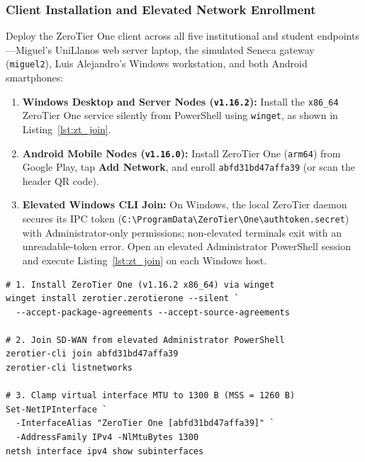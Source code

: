 \subsubsection{Client Installation and Elevated Network Enrollment}
Deploy the ZeroTier One client across all five institutional and student endpoints---Miguel's UniLlanos web server laptop, the simulated Seneca gateway (\texttt{miguel2}), Luis Alejandro's Windows workstation, and both Android smartphones:
\begin{enumerate}
    \item \textbf{Windows Desktop and Server Nodes (\texttt{v1.16.2}):} Install the \texttt{x86\_64} ZeroTier One service silently from PowerShell using \texttt{winget}, as shown in Listing~\ref{lst:zt_join}.
    \item \textbf{Android Mobile Nodes (\texttt{v1.16.0}):} Install ZeroTier One (\texttt{arm64}) from Google Play, tap \textbf{Add Network}, and enroll \texttt{abfd31bd47affa39} (or scan the header QR code).
    \item \textbf{Elevated Windows CLI Join:} On Windows, the local ZeroTier daemon secures its IPC token (\texttt{C:\textbackslash{}ProgramData\textbackslash{}\allowbreak ZeroTier\textbackslash{}One\textbackslash{}\allowbreak authtoken.secret}) with Administrator-only permissions; non-elevated terminals exit with an unreadable-token error. Open an elevated Administrator PowerShell session and execute Listing~\ref{lst:zt_join} on each Windows host.
\end{enumerate}

\begin{lstlisting}[caption={Windows ZeroTier One installation, elevated join, and MTU tuning commands.},label={lst:zt_join}]
# 1. Install ZeroTier One (v1.16.2 x86_64) via winget
winget install zerotier.zerotierone --silent `
  --accept-package-agreements --accept-source-agreements

# 2. Join SD-WAN from elevated Administrator PowerShell
zerotier-cli join abfd31bd47affa39
zerotier-cli listnetworks

# 3. Clamp virtual interface MTU to 1300 B (MSS = 1260 B)
Set-NetIPInterface `
  -InterfaceAlias "ZeroTier One [abfd31bd47affa39]" `
  -AddressFamily IPv4 -NlMtuBytes 1300
netsh interface ipv4 show subinterfaces
\end{lstlisting}

